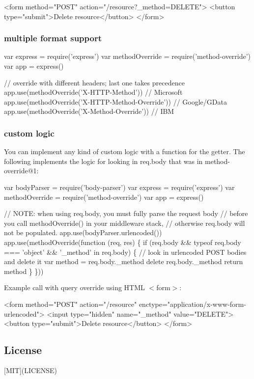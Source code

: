 \begin{DoxyCode}
<form method="POST" action="/resource?\_method=DELETE">
  <button type="submit">Delete resource</button>
</form>
\end{DoxyCode}


\subsubsection*{multiple format support}


\begin{DoxyCode}
var express = require('express')
var methodOverride = require('method-override')
var app = express()

// override with different headers; last one takes precedence
app.use(methodOverride('X-HTTP-Method')) //          Microsoft
app.use(methodOverride('X-HTTP-Method-Override')) // Google/GData
app.use(methodOverride('X-Method-Override')) //      IBM
\end{DoxyCode}


\subsubsection*{custom logic}

You can implement any kind of custom logic with a function for the {\ttfamily getter}. The following implements the logic for looking in {\ttfamily req.\+body} that was in {\ttfamily method-\/override@1}\+:


\begin{DoxyCode}
var bodyParser = require('body-parser')
var express = require('express')
var methodOverride = require('method-override')
var app = express()

// NOTE: when using req.body, you must fully parse the request body
//       before you call methodOverride() in your middleware stack,
//       otherwise req.body will not be populated.
app.use(bodyParser.urlencoded())
app.use(methodOverride(function (req, res) \{
  if (req.body && typeof req.body === 'object' && '\_method' in req.body) \{
    // look in urlencoded POST bodies and delete it
    var method = req.body.\_method
    delete req.body.\_method
    return method
  \}
\}))
\end{DoxyCode}


Example call with query override using H\+T\+ML {\ttfamily $<$form$>$}\+:


\begin{DoxyCode}
<form method="POST" action="/resource" enctype="application/x-www-form-urlencoded">
  <input type="hidden" name="\_method" value="DELETE">
  <button type="submit">Delete resource</button>
</form>
\end{DoxyCode}


\subsection*{License}

\mbox{[}M\+IT\mbox{]}(L\+I\+C\+E\+N\+SE) 